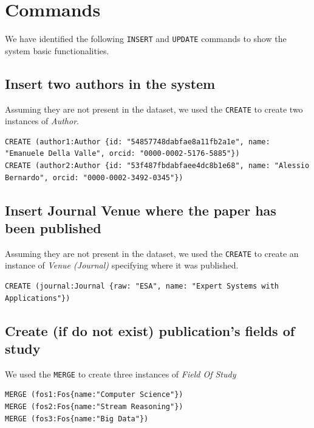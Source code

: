 \documentclass{Configuration_Files/PoliMi3i_thesis}
\begin{document}
\section{Commands}
We have identified the following \verb |INSERT| and \verb |UPDATE| commands to show the system basic functionalities.

\subsection{Insert two authors in the system}
Assuming they are not present in the dataset, we used the \verb |CREATE| to create two instances of \emph{Author}.
\begin{lstlisting}[language=cypher, label=lst:cypher-example]
CREATE (author1:Author {id: "54857748dabfae8a11fb2a1e", name: "Emanuele Della Valle", orcid: "0000-0002-5176-5885"})
CREATE (author2:Author {id: "53f487fbdabfaee4dc8b1e68", name: "Alessio Bernardo", orcid: "0000-0002-3492-0345"})
\end{lstlisting}

\subsection{Insert Journal Venue where the paper has been published}
Assuming they are not present in the dataset, we used the \verb |CREATE| to create an instance of \emph{Venue (Journal)}
specifying where it was published.
\begin{lstlisting}[language=cypher, label=lst:cypher-example]
CREATE (journal:Journal {raw: "ESA", name: "Expert Systems with Applications"})
\end{lstlisting}

\subsection{Create (if do not exist) publication's fields of study}
We used the \verb |MERGE| to create three instances of \emph{Field Of Study}
\begin{lstlisting}[language=cypher, label=lst:cypher-example]
MERGE (fos1:Fos{name:"Computer Science"})
MERGE (fos2:Fos{name:"Stream Reasoning"})
MERGE (fos3:Fos{name:"Big Data"})
\end{lstlisting}
\end{document}
